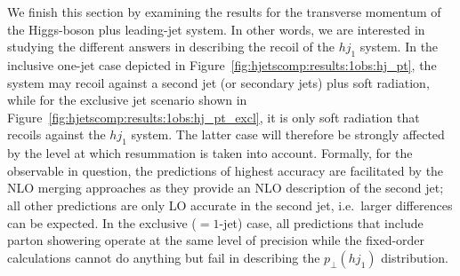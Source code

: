 We finish this section by examining the results for the transverse
momentum of the Higgs-boson plus leading-jet system. In other words,
we are interested in studying the different answers in describing the
recoil of the $hj_1$ system. In the inclusive one-jet case depicted in
Figure~\ref{fig:hjetscomp:results:1obs:hj_pt}, the system may recoil
against a second jet (or secondary jets) plus soft radiation, while
for the exclusive jet scenario shown in
Figure~\ref{fig:hjetscomp:results:1obs:hj_pt_excl}, it is only soft
radiation that recoils against the $hj_1$ system. The latter case will
therefore be strongly affected by the level at which resummation is
taken into account. Formally, for the observable in question, the
predictions of highest accuracy are facilitated by the NLO merging
approaches as they provide an NLO description of the second jet; all
other predictions are only LO accurate in the second jet, i.e.~larger
differences can be expected. In the exclusive ($=1$-jet) case, all
predictions that include parton showering operate at the same level of
precision while the fixed-order calculations cannot do anything but
fail in describing the $p_\perp(hj_1)$ distribution.

